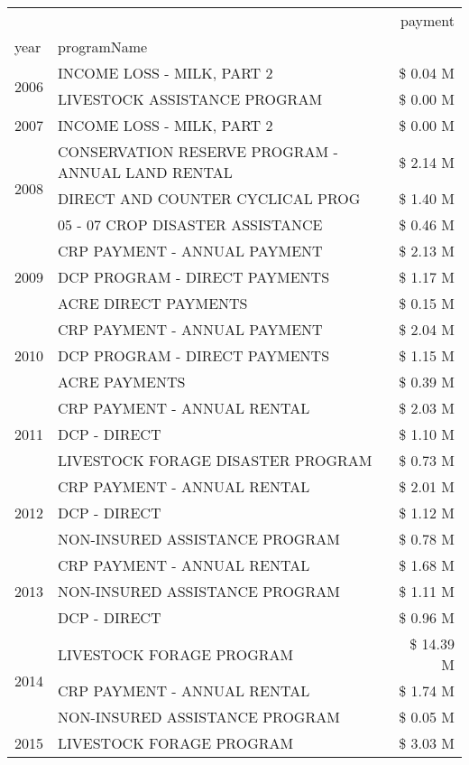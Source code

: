 \begin{tabular}{llr}
\toprule
 &  & payment \\
year & programName &  \\
\midrule
\multirow[t]{2}{*}{2006} & INCOME LOSS - MILK, PART 2 & \$ 0.04 M \\
 & LIVESTOCK ASSISTANCE PROGRAM & \$ 0.00 M \\
\cline{1-3}
2007 & INCOME LOSS - MILK, PART 2 & \$ 0.00 M \\
\cline{1-3}
\multirow[t]{3}{*}{2008} & CONSERVATION RESERVE PROGRAM - ANNUAL LAND RENTAL & \$ 2.14 M \\
 & DIRECT AND COUNTER CYCLICAL PROG & \$ 1.40 M \\
 & 05 - 07 CROP DISASTER ASSISTANCE & \$ 0.46 M \\
\cline{1-3}
\multirow[t]{3}{*}{2009} & CRP PAYMENT - ANNUAL PAYMENT & \$ 2.13 M \\
 & DCP PROGRAM - DIRECT PAYMENTS & \$ 1.17 M \\
 & ACRE DIRECT PAYMENTS & \$ 0.15 M \\
\cline{1-3}
\multirow[t]{3}{*}{2010} & CRP PAYMENT - ANNUAL PAYMENT & \$ 2.04 M \\
 & DCP PROGRAM - DIRECT PAYMENTS & \$ 1.15 M \\
 & ACRE PAYMENTS & \$ 0.39 M \\
\cline{1-3}
\multirow[t]{3}{*}{2011} & CRP PAYMENT - ANNUAL RENTAL & \$ 2.03 M \\
 & DCP - DIRECT & \$ 1.10 M \\
 & LIVESTOCK FORAGE DISASTER PROGRAM & \$ 0.73 M \\
\cline{1-3}
\multirow[t]{3}{*}{2012} & CRP PAYMENT - ANNUAL RENTAL & \$ 2.01 M \\
 & DCP - DIRECT & \$ 1.12 M \\
 & NON-INSURED ASSISTANCE PROGRAM & \$ 0.78 M \\
\cline{1-3}
\multirow[t]{3}{*}{2013} & CRP PAYMENT - ANNUAL RENTAL & \$ 1.68 M \\
 & NON-INSURED ASSISTANCE PROGRAM & \$ 1.11 M \\
 & DCP - DIRECT & \$ 0.96 M \\
\cline{1-3}
\multirow[t]{3}{*}{2014} & LIVESTOCK FORAGE PROGRAM & \$ 14.39 M \\
 & CRP PAYMENT - ANNUAL RENTAL & \$ 1.74 M \\
 & NON-INSURED ASSISTANCE PROGRAM & \$ 0.05 M \\
\cline{1-3}
\multirow[t]{3}{*}{2015} & LIVESTOCK FORAGE PROGRAM & \$ 3.03 M \\

\end{tabular}
